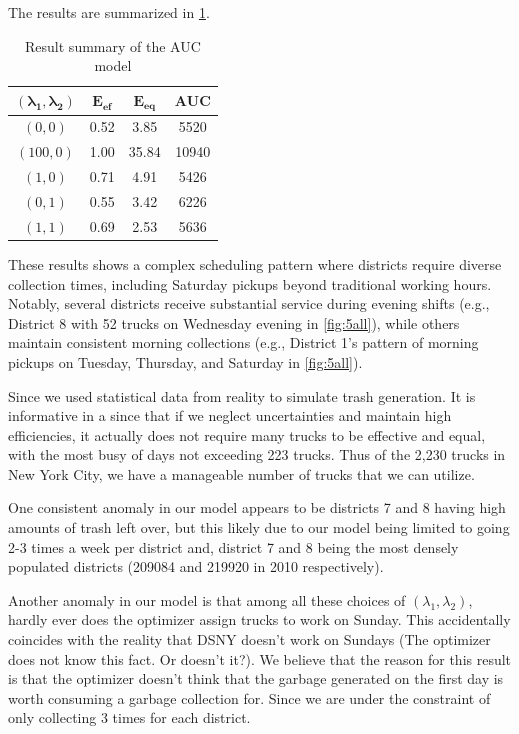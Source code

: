 \documentclass{article}
\begin{document}
The results are summarized in \cref{tab:AUCresults}.

\begin{table}[H]
\centering
\begin{tabular}{|c|c|c|c|}
\hline
$\mathbf{(\lambda_1, \lambda_2)}$ & $\mathbf{E_{ef}}$ & $\mathbf{E_{eq}}$ & $\mathbf{AUC}$ \\ \hline
$(0,0)$                  & 0.52     & 3.85     & 5520  \\ \hline
$(100,0)$                & 1.00     & 35.84    & 10940 \\ \hline
$(1,0)$                  & 0.71     & 4.91     & 5426  \\ \hline
$(0,1)$                  & 0.55     & 3.42     & 6226  \\ \hline
$(1,1)$                  & 0.69     & 2.53     & 5636  \\ \hline
\end{tabular}
\caption{Result summary of the AUC model}
\label{tab:AUCresults}
\end{table}

These results shows a complex scheduling pattern where districts require diverse collection times, including Saturday pickups beyond traditional working hours. Notably, several districts receive substantial service during evening shifts (e.g., District 8 with 52 trucks on Wednesday evening in \cref{fig:5all}), while others maintain consistent morning collections (e.g., District 1's pattern of morning pickups on Tuesday, Thursday, and Saturday in \cref{fig:5all}).

Since we used statistical data from reality to simulate trash generation. It is informative in a since that if we neglect uncertainties and maintain high efficiencies, it actually does not require many trucks to be effective and equal, with the most busy of days not exceeding 223 trucks. Thus of the 2,230 trucks in New York City, we have a manageable number of trucks that we can utilize.

One consistent anomaly in our model appears to be districts 7 and 8 having high amounts of trash left over, but this likely due to our model being limited to going 2-3 times a week per district and, district 7 and 8 being the most densely populated districts (209084 and 219920 in 2010 respectively).

Another anomaly in our model is that among all these choices of $(\lambda_1, \lambda_2)$, hardly ever does the optimizer assign trucks to work on Sunday. This accidentally coincides with the reality that DSNY doesn't work on Sundays (The optimizer does not know this fact. Or doesn't it?). We believe that the reason for this result is that the optimizer doesn't think that the garbage generated on the first day is worth consuming a garbage collection for. Since we are under the constraint of only collecting 3 times for each district.
\end{document}
